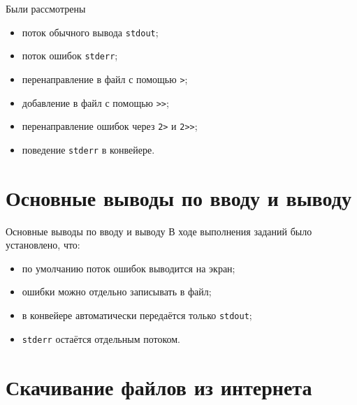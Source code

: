 \documentclass[
  11pt,
  ignorenonframetext,
  aspectratio=169,
  russian,
]{beamer}
\providecommand{\tightlist}{%
  \setlength{\itemsep}{0pt}\setlength{\parskip}{0pt}}
\begin{document}
\begin{frame}[fragile]{Были рассмотрены}
\protect{}\label{ux431ux44bux43bux438-ux440ux430ux441ux441ux43cux43eux442ux440ux435ux43dux44b}
\begin{itemize}[<+->]
\tightlist
\item
  поток обычного вывода \texttt{stdout};
\item
  поток ошибок \texttt{stderr};
\item
  перенаправление в файл с помощью \texttt{\textgreater{}};
\item
  добавление в файл с помощью \texttt{\textgreater{}\textgreater{}};
\item
  перенаправление ошибок через \texttt{2\textgreater{}} и
  \texttt{2\textgreater{}\textgreater{}};
\item
  поведение \texttt{stderr} в конвейере.
\end{itemize}
\end{frame}

\section{Основные выводы по вводу и
выводу}\label{ux43eux441ux43dux43eux432ux43dux44bux435-ux432ux44bux432ux43eux434ux44b-ux43fux43e-ux432ux432ux43eux434ux443-ux438-ux432ux44bux432ux43eux434ux443}

\begin{frame}[fragile]{Основные выводы по вводу и выводу}
В ходе выполнения заданий было установлено, что:

\begin{itemize}[<+->]
\tightlist
\item
  по умолчанию поток ошибок выводится на экран;
\item
  ошибки можно отдельно записывать в файл;
\item
  в конвейере автоматически передаётся только \texttt{stdout};
\item
  \texttt{stderr} остаётся отдельным потоком.
\end{itemize}
\end{frame}

\section{Скачивание файлов из
интернета}\label{ux441ux43aux430ux447ux438ux432ux430ux43dux438ux435-ux444ux430ux439ux43bux43eux432-ux438ux437-ux438ux43dux442ux435ux440ux43dux435ux442ux430}
\end{document}
